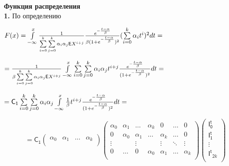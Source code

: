 \documentclass[a4paper,12pt]{article}
\begin{document}
\noindent\textbf{Функция распределения}\\

\noindent\textbf{1.} По определению

\begin{center}
$F(x) = \int\limits_{-\infty}^x {1\over{\sum\limits_{i = 0}^k}\sum\limits_{j=0}^k\alpha_i \alpha_j \mathsf{E}X^{i + j}} {e^{-{t - \alpha\over{\beta}}}\over{\beta(1 + e^{-{t - \alpha\over{\beta}}}})^2}(\sum\limits_{i = 0}^k \alpha_i t^i)^2 d t =$
\end{center}

\begin{center}
$= {1\over{\beta\sum\limits_{i = 0}^k}\sum\limits_{j=0}^k\alpha_i \alpha_j \mathsf{E}X^{i + j}} \int\limits_{-\infty}^x \sum\limits_{i = 0}^k \sum\limits_{j = 0}^k \alpha_i \alpha_j t^{i + j} {e^{-{t - \alpha\over{\beta}}}\over{(1 + e^{-{t - \alpha\over{\beta}}}})^2} d t =$
\end{center}

\begin{center}
    $= \mathsf{C_1} \sum\limits_{i = 0}^k \sum\limits_{j = 0}^k \alpha_i \alpha_j \int\limits_{-\infty}^x {1\over{\beta}} t^{i + j} {e^{-{t - \alpha\over{\beta}}}\over{(1 + e^{-{t - \alpha\over{\beta}}}})^2} d t = $
\end{center}

\begin{displaymath}
    = \mathsf{C_1} \begin{pmatrix}
        \alpha_0 & \alpha_1 & \ldots & \alpha_k \\
    \end{pmatrix} \begin{pmatrix}
        \alpha_0 & \alpha_1 & \ldots & \alpha_k & 0 & \ldots & 0 \\
        0 & \alpha_0 & \alpha_1 & \ldots & \alpha_k & \ldots & 0 \\
        \vdots &  & \vdots &  & \vdots & \ddots & \vdots\\
        0 & \ldots & 0 & \alpha_0 & \alpha_1 &\ldots & \alpha_k \\
    \end{pmatrix} \begin{pmatrix}
        \mathsf{I^t_0} \\ \mathsf{I^t_1} \\ \vdots \\ \mathsf{I^t}_{\mathsf{2}k} \\
    \end{pmatrix}
\end{displaymath}\\
\end{document}
